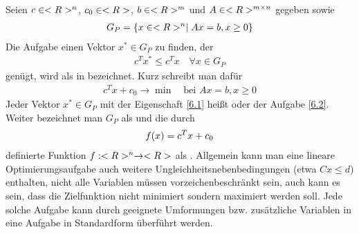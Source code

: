 Seien $c\in<R>^n$, $c_0\in<R>$, $b\in<R>^m$ und $A\in<R>^{m\times n}$ gegeben sowie
\begin{align}
	G_P = \{x\in<R>^n\mid Ax=b,x\ge 0\}\notag
\end{align}
Die Aufgabe einen Vektor $x^\ast\in G_P$ zu finden, der
\begin{align}
	\label{6.1}
	c^Tx^\ast \le c^Tx\quad\forall x\in G_P
\end{align} 
genügt, wird als  in  bezeichnet. Kurz schreibt man dafür
\begin{align}
	\label{6.2}
	c^Tx+c_0\to\min\quad\text{bei } Ax=b, x\ge 0
\end{align}
Jeder Vektor $x^\ast\in G_P$ mit der Eigenschaft \cref{6.1} heißt  oder  der Aufgabe \cref{6.2}. Weiter bezeichnet man $G_P$ als  und die durch 
\begin{align}
	f(x) = c^Tx+c_0\notag
\end{align}
definierte Funktion $f:<R>^n\to<R>$ als . Allgemein kann man eine lineare Optimierungsaufgabe auch weitere Ungleichheitsnebenbedingungen (etwa $Cx\le d$) enthalten, nicht alle Variablen müssen vorzeichenbeschränkt sein, auch kann es sein, dass die Zielfunktion nicht minimiert sondern maximiert werden soll. Jede solche Aufgabe kann durch geeignete Umformungen bzw. zusätzliche Variablen in eine Aufgabe in Standardform überführt werden.

